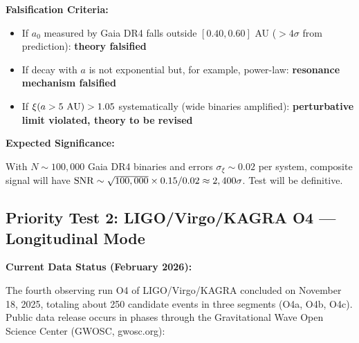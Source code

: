 \documentclass[11pt,a4paper]{article}
\providecommand{\tightlist}{\setlength{\itemsep}{0pt}\setlength{\parskip}{0pt}}
\begin{document}
\textbf{Falsification Criteria:}

\begin{itemize}
\tightlist
\item
  If \(a_0\) measured by Gaia DR4 falls outside \([0.40, 0.60]\) AU
  (\(> 4\sigma\) from prediction): \textbf{theory falsified}
\item
  If decay with \(a\) is not exponential but, for example, power-law:
  \textbf{resonance mechanism falsified}
\item
  If \(\xi(a > 5~{\rm AU}) > 1.05\) systematically (wide binaries
  amplified): \textbf{perturbative limit violated, theory to be revised}
\end{itemize}

\textbf{Expected Significance:}

With \(N \sim 100,000\) Gaia DR4 binaries and errors
\(\sigma_\xi \sim 0.02\) per system, composite signal will have
\({\rm SNR} \sim \sqrt{100,000} \times 0.15/0.02 \approx 2,400\sigma\).
Test will be definitive.

\hypertarget{priority-test-2-ligovirgokagra-o4-longitudinal-mode}{%
\subsection{Priority Test 2: LIGO/Virgo/KAGRA O4 --- Longitudinal
Mode}\label{priority-test-2-ligovirgokagra-o4-longitudinal-mode}}

\textbf{Current Data Status (February 2026):}

The fourth observing run O4 of LIGO/Virgo/KAGRA concluded on November
18, 2025, totaling about 250 candidate events in three segments (O4a,
O4b, O4c). Public data release occurs in phases through the
Gravitational Wave Open Science Center (GWOSC, gwosc.org):
\end{document}
